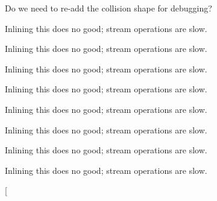 \begin{DoxyRefList}
Do we need to re-\/add the collision shape for debugging?  
\item[\label{todo__todo000116}%
\hypertarget{todo__todo000116}{}%
Member \hyperlink{_c_p_g_equations_8h_a5a61194729762e1b288a7e8b12d660df}{operator$<$$<$} (std\-::ostream \&os, const \hyperlink{class_c_p_g_equations}{C\-P\-G\-Equations} \&obj)]Inlining this does no good; stream operations are slow.  
\item[\label{todo__todo000107}%
\hypertarget{todo__todo000107}{}%
Member \hyperlink{tg_util_8h_ac7882eaeeb8e0c93fe08b90adcbf06ec}{operator$<$$<$} (std\-::ostream \&os, const bt\-Quaternion \&q)]Inlining this does no good; stream operations are slow.  
\item[\label{todo__todo000108}%
\hypertarget{todo__todo000108}{}%
Member \hyperlink{tg_util_8h_a7e64726736e7fafd9cd9ee046afe6b54}{operator$<$$<$} (std\-::ostream \&os, const bt\-Vector3 \&v)]Inlining this does no good; stream operations are slow.  
\item[\label{todo__todo000109}%
\hypertarget{todo__todo000109}{}%
Member \hyperlink{tg_util_8h_a800df9062cc44a651daf5d26df9dce12}{operator$<$$<$} (std\-::ostream \&os, const bt\-Transform \&xf)]Inlining this does no good; stream operations are slow.  
\item[\label{todo__todo000111}%
\hypertarget{todo__todo000111}{}%
Member \hyperlink{tg_util_8h_a4ab2e7269cf18d0d21c48f2714909ebf}{operator$<$$<$} (std\-::ostream \&os, const bt\-Collision\-Shape \&cs)]Inlining this does no good; stream operations are slow.  
\item[\label{todo__todo000112}%
\hypertarget{todo__todo000112}{}%
Member \hyperlink{tg_util_8h_a9448c6c8a7cd774cf2cd7b199277a6f1}{operator$<$$<$} (std\-::ostream \&os, const bt\-Compound\-Shape \&cs)]Inlining this does no good; stream operations are slow.  
\item[\label{todo__todo000115}%
\hypertarget{todo__todo000115}{}%
Member \hyperlink{_c_p_g_edge_8h_ae6e09f6882e751a88ce2b79e69670415}{operator$<$$<$} (std\-::ostream \&os, const \hyperlink{class_c_p_g_edge}{C\-P\-G\-Edge} \&obj)]Inlining this does no good; stream operations are slow.  
\item[\label{todo__todo000119}%
\hypertarget{todo__todo000119}{}%
Member \hyperlink{_c_p_g_node_8h_a4630a34253957d5b37b5e211cb2a6397}{operator$<$$<$} (std\-::ostream \&os, const \hyperlink{class_c_p_g_node}{C\-P\-G\-Node} \&obj)]Inlining this does no good; stream operations are slow.  
\item[\label{todo__todo000110}%
\hypertarget{todo__todo000110}{}%

\end{DoxyRefList}
